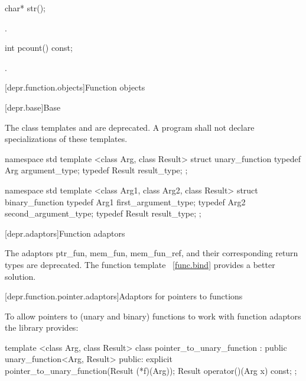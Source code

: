 %
\begin{itemdecl}
char* str();
\end{itemdecl}

\begin{itemdescr}
\pnum
\returns
{}.
\end{itemdescr}

%
\begin{itemdecl}
int pcount() const;
\end{itemdecl}

\begin{itemdescr}
\pnum
\returns
{}.
\end{itemdescr}

[depr.function.objects]{Function objects}

[depr.base]{Base}

\pnum
The class templates  and  are deprecated.
A program shall not declare specializations of these templates.

%
\begin{codeblock}
namespace std {
  template <class Arg, class Result>
  struct unary_function {
    typedef Arg    argument_type;
    typedef Result result_type;
  };
}
\end{codeblock}

%
\begin{codeblock}
namespace std {
  template <class Arg1, class Arg2, class Result>
  struct binary_function {
    typedef Arg1   first_argument_type;
    typedef Arg2   second_argument_type;
    typedef Result result_type;
  };
}
\end{codeblock}

[depr.adaptors]{Function adaptors}

\pnum
The adaptors ptr_fun, mem_fun, mem_fun_ref, and their corresponding return types
are deprecated. \enternote The function template ~\ref{func.bind} provides
a better solution. \exitnote

[depr.function.pointer.adaptors]{Adaptors for pointers to functions}

\pnum
To allow pointers to (unary and binary) functions to work with function adaptors
the library provides:

%
\begin{itemdecl}
template <class Arg, class Result>
class pointer_to_unary_function : public unary_function<Arg, Result> {
public:
  explicit pointer_to_unary_function(Result (*f)(Arg));
  Result operator()(Arg x) const;
};
\end{itemdecl}

